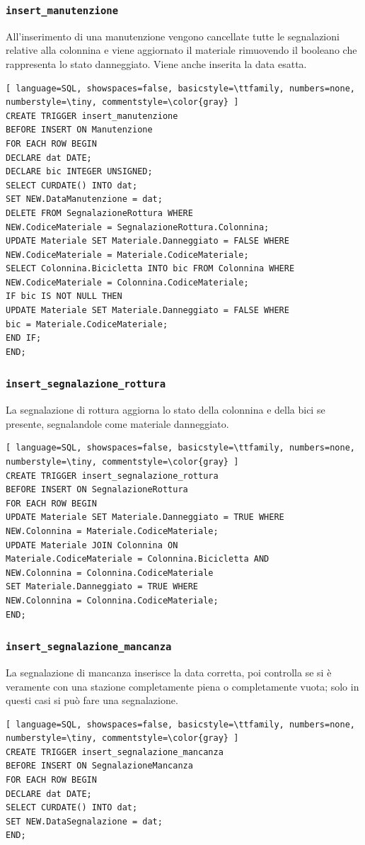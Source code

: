 \documentclass[a4paper,twoside]{article}
\begin{document}
\subsubsection{\texttt{insert\_manutenzione}}
All'inserimento di una manutenzione vengono cancellate tutte le segnalazioni relative alla colonnina e viene aggiornato il materiale rimuovendo il booleano che rappresenta lo stato danneggiato. Viene anche inserita la data esatta.
\begin{lstlisting}[ language=SQL, showspaces=false, basicstyle=\ttfamily, numbers=none, numberstyle=\tiny, commentstyle=\color{gray} ]
CREATE TRIGGER insert_manutenzione
BEFORE INSERT ON Manutenzione
FOR EACH ROW BEGIN
DECLARE dat DATE;
DECLARE bic INTEGER UNSIGNED;
SELECT CURDATE() INTO dat;
SET NEW.DataManutenzione = dat;
DELETE FROM SegnalazioneRottura WHERE
NEW.CodiceMateriale = SegnalazioneRottura.Colonnina;
UPDATE Materiale SET Materiale.Danneggiato = FALSE WHERE
NEW.CodiceMateriale = Materiale.CodiceMateriale;
SELECT Colonnina.Bicicletta INTO bic FROM Colonnina WHERE
NEW.CodiceMateriale = Colonnina.CodiceMateriale;
IF bic IS NOT NULL THEN
UPDATE Materiale SET Materiale.Danneggiato = FALSE WHERE
bic = Materiale.CodiceMateriale;
END IF;
END;
\end{lstlisting}
\subsubsection{\texttt{insert\_segnalazione\_rottura}}
La segnalazione di rottura aggiorna lo stato della colonnina e della bici se presente, segnalandole come materiale danneggiato.
\begin{lstlisting}[ language=SQL, showspaces=false, basicstyle=\ttfamily, numbers=none, numberstyle=\tiny, commentstyle=\color{gray} ]
CREATE TRIGGER insert_segnalazione_rottura
BEFORE INSERT ON SegnalazioneRottura
FOR EACH ROW BEGIN
UPDATE Materiale SET Materiale.Danneggiato = TRUE WHERE
NEW.Colonnina = Materiale.CodiceMateriale;
UPDATE Materiale JOIN Colonnina ON
Materiale.CodiceMateriale = Colonnina.Bicicletta AND
NEW.Colonnina = Colonnina.CodiceMateriale
SET Materiale.Danneggiato = TRUE WHERE
NEW.Colonnina = Colonnina.CodiceMateriale;
END;
\end{lstlisting}
\subsubsection{\texttt{insert\_segnalazione\_mancanza}}
La segnalazione di mancanza inserisce la data corretta, poi controlla se si è veramente con una stazione completamente piena o completamente vuota; solo in questi casi si può fare una segnalazione.
\begin{lstlisting}[ language=SQL, showspaces=false, basicstyle=\ttfamily, numbers=none, numberstyle=\tiny, commentstyle=\color{gray} ]
CREATE TRIGGER insert_segnalazione_mancanza
BEFORE INSERT ON SegnalazioneMancanza
FOR EACH ROW BEGIN
DECLARE dat DATE;
SELECT CURDATE() INTO dat;
SET NEW.DataSegnalazione = dat;
END;
\end{lstlisting}
\newpage
\end{document}
